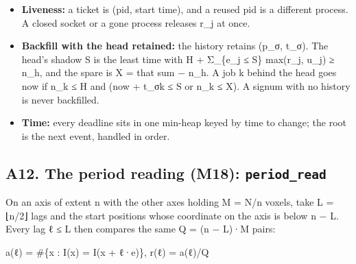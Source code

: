 \begin{itemize}
\item \textbf{Liveness:} a ticket is (pid, start time), and a reused pid is a different process. A closed socket or a gone process releases r\_\allowbreak{}j at once.
\item \textbf{Backfill with the head retained:} the history retains (p\_\allowbreak{}σ, t\_\allowbreak{}σ). The head's shadow S is the least time with H + Σ\_\allowbreak{}\{e\_\allowbreak{}j ≤ S\} max(r\_\allowbreak{}j, u\_\allowbreak{}j) ≥ n\_\allowbreak{}h, and the spare is X = that sum − n\_\allowbreak{}h. A job k behind the head goes now if n\_\allowbreak{}k ≤ H and (now + t\_\allowbreak{}σk ≤ S or n\_\allowbreak{}k ≤ X). A signum with no history is never backfilled.
\item \textbf{Time:} every deadline sits in one min-heap keyed by time to change; the root is the next event, handled in order.
\end{itemize}

\subsection{\texorpdfstring{A12. The period reading (M18): \texttt{period\_\allowbreak{}read}}{A12. The period reading (M18): period\_read}}

On an axis of extent n with the other axes holding M = N/n voxels, take L = ⌊n/2⌋ lags and the start positions whose coordinate on the axis is below n − L. Every lag ℓ ≤ L then compares the same Q = (n − L)·M pairs:

a(ℓ) = \#\{x : I(x) = I(x + ℓ·e)\},  r(ℓ) = a(ℓ)/Q

